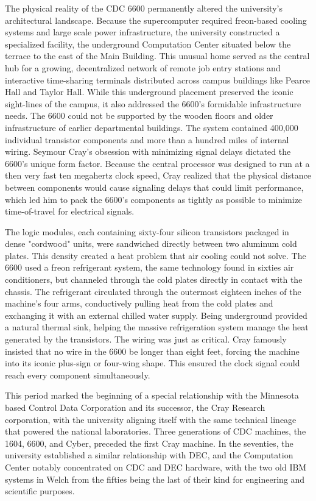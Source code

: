 The physical reality of the CDC 6600 permanently altered the university's architectural landscape. Because the supercomputer required freon-based cooling systems and large scale power infrastructure, the university constructed a specialized facility, the underground Computation Center situated below the terrace to the east of the Main Building. This unusual home served as the central hub for a growing, decentralized network of remote job entry stations and interactive time-sharing terminals distributed across campus buildings like Pearce Hall and Taylor Hall. While this underground placement preserved the iconic sight-lines of the campus, it also addressed the 6600’s formidable infrastructure needs. The 6600 could not be supported by the wooden floors and older infrastructure of earlier departmental buildings. The system contained 400,000 individual transistor components and more than a hundred miles of internal wiring. Seymour Cray’s obsession with minimizing signal delays dictated the 6600's unique form factor. Because the central processor was designed to run at a then very fast ten megahertz clock speed, Cray realized that the physical distance between components would cause signaling delays that could limit performance, which led him to pack the 6600's components as tightly as possible to minimize time-of-travel for electrical signals. 

The logic modules, each containing sixty-four silicon transistors packaged in dense "cordwood" units, were sandwiched directly between two aluminum cold plates. This density created a heat problem that air cooling could not solve. The 6600 used a freon refrigerant system, the same technology found in sixties air conditioners, but channeled through the cold plates directly in contact with the chassis. The refrigerant circulated through the outermost eighteen inches of the machine's four arms, conductively pulling heat from the cold plates and exchanging it with an external chilled water supply. Being underground provided a natural thermal sink, helping the massive refrigeration system manage the heat generated by the transistors. The wiring was just as critical. Cray famously insisted that no wire in the 6600 be longer than eight feet, forcing the machine into its iconic plus-sign or four-wing shape. This ensured the clock signal could reach every component simultaneously. 

This period marked the beginning of a special relationship with the Minnesota based Control Data Corporation and its successor, the Cray Research corporation, with the university aligning itself with the same technical lineage that powered the national laboratories. Three generations of CDC machines, the 1604, 6600, and Cyber, preceded the first Cray machine. In the seventies, the university established a similar relationship with DEC, and the Computation Center notably concentrated on CDC and DEC hardware, with the two old IBM systems in Welch from the fifties being the last of their kind for engineering and scientific purposes.

